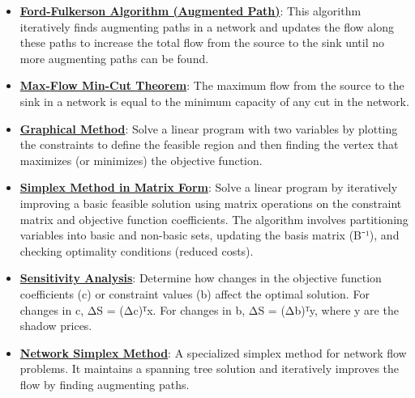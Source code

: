 \documentclass{article}%
\begin{document}
\begin{itemize}[leftmargin=*]
\item \href{https://www.math.purdue.edu/~yipn/421/2024-11-19-MaxFlowMinCut.pdf#page=12}{\textbf{Ford{-}Fulkerson Algorithm (Augmented Path)}}: This algorithm iteratively finds augmenting paths in a network and updates the flow along these paths to increase the total flow from the source to the sink until no more augmenting paths can be found.%
\item \href{https://www.math.purdue.edu/~yipn/421/2024-11-19-MaxFlowMinCut.pdf#page=4}{\textbf{Max{-}Flow Min{-}Cut Theorem}}: The maximum flow from the source to the sink in a network is equal to the minimum capacity of any cut in the network.%
\item \href{https://www.math.purdue.edu/~yipn/421/2024-12-03-Duality.pdf#page=3}{\textbf{Graphical Method}}: Solve a linear program with two variables by plotting the constraints to define the feasible region and then finding the vertex that maximizes (or minimizes) the objective function. %
\item \href{https://www.math.purdue.edu/~yipn/421/2024-12-03-Duality.pdf#page=7}{\textbf{Simplex Method in Matrix Form}}: Solve a linear program by iteratively improving a basic feasible solution using matrix operations on the constraint matrix and objective function coefficients. The algorithm involves partitioning variables into basic and non-basic sets, updating the basis matrix (B⁻¹), and checking optimality conditions (reduced costs). %
\item \href{https://www.math.purdue.edu/~yipn/421/2024-12-03-Duality.pdf#page=11}{\textbf{Sensitivity Analysis}}: Determine how changes in the objective function coefficients (c) or constraint values (b) affect the optimal solution. For changes in c, ΔS = (Δc)ᵀx. For changes in b, ΔS = (Δb)ᵀy, where y are the shadow prices. %
\item \href{https://www.math.purdue.edu/~yipn/421/2024-12-03-Duality.pdf#page=22}{\textbf{Network Simplex Method}}: A specialized simplex method for network flow problems. It maintains a spanning tree solution and iteratively improves the flow by finding augmenting paths. %
\end{itemize}

%
\end{document}
